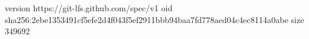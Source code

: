 version https://git-lfs.github.com/spec/v1
oid sha256:2ebe1353491cf5efe2d4f043f5ef2911bbb94baa7fd778aed04c4ec8114a0abe
size 349692

